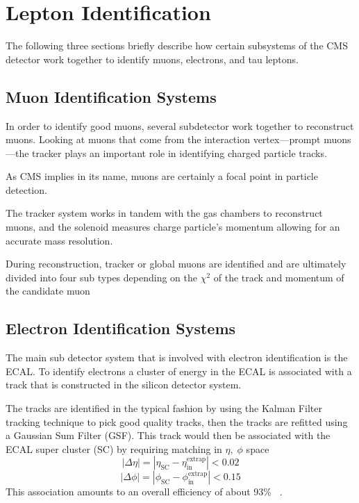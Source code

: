 
\section{Lepton Identification}
The following three sections briefly describe how certain subsystems of the CMS detector work together to identify muons, electrons, and tau leptons. 

\subsection{Muon Identification Systems}

In order to identify good muons, several subdetector work together to reconstruct muons. Looking at muons that come from the interaction vertex---prompt muons---the tracker plays an important role in identifying charged particle tracks. 

As CMS implies in its name, muons are certainly a focal point in particle detection. 

The tracker system works in tandem with the gas chambers to reconstruct muons, and the solenoid measures charge particle's momentum allowing for an accurate mass resolution.  


During reconstruction, tracker or global muons are identified and are ultimately divided into four sub types depending on the $\chi^2$ of the track and momentum of the candidate muon ~\cite{CMS-PAS-PFT-09-001,Kratschmer:1956760}


\subsection{Electron Identification Systems}

The main sub detector system that is involved with electron identification is the ECAL. To identify electrons a cluster of energy in the ECAL is associated with a track that is constructed in the silicon detector system. 

The tracks are identified in the typical fashion by using the Kalman Filter tracking technique to pick good quality tracks, then the tracks are refitted using a Gaussian Sum Filter (GSF). 
This track would then be associated with the ECAL super cluster (SC) by requiring matching in $\eta,\;\phi$ space
\begin{equation}|\Delta\eta| = |\eta_{\text{SC}} - \eta_{\text{in}}^{\text{extrap}}| < 0.02\end{equation}
\begin{equation}|\Delta\phi| = |\phi_{\text{SC}} - \phi_{\text{in}}^{\text{extrap}}| < 0.15\end{equation}
This association amounts to an overall efficiency of about 93\% ~\cite{Khachatryan:2015hwa}. 


